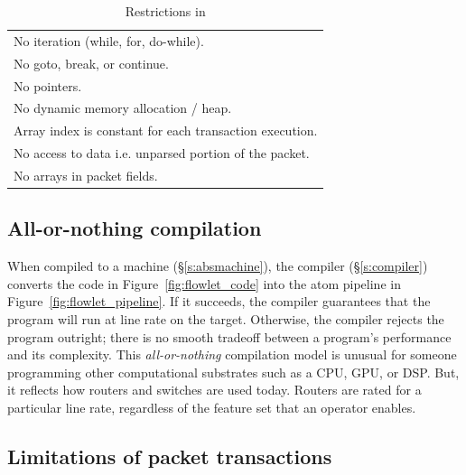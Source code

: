 \begin{table}
  \begin{tabular}{p{}}
    No iteration (while, for, do-while).\\
    No goto, break, or continue.\\
    No pointers.\\
    No dynamic memory allocation / heap.\\
    Array index is constant for each transaction execution.\\
    No access to data i.e. unparsed portion of the packet.\\
    No arrays in packet fields.\\
  \end{tabular}
  \caption{Restrictions in \pktlanguage}
  \label{tab:restrict}
\end{table}

\subsection{All-or-nothing compilation}

When compiled to a \absmachine machine (\S\ref{s:absmachine}), the
\pktlanguage compiler (\S\ref{s:compiler}) converts the code in
Figure~\ref{fig:flowlet_code} into the atom pipeline in
Figure~\ref{fig:flowlet_pipeline}. If it succeeds, the compiler
guarantees that the program will run at line rate on the target.
Otherwise, the compiler rejects the program outright; there is no
smooth tradeoff between a program's performance and its complexity.
This {\em all-or-nothing} compilation model is unusual for someone
programming other computational substrates such as a CPU, GPU, or
DSP. But, it reflects how routers and switches are used today. Routers
are rated for a particular line rate, regardless of the feature set
that an operator enables. 


\subsection{Limitations of packet transactions}

